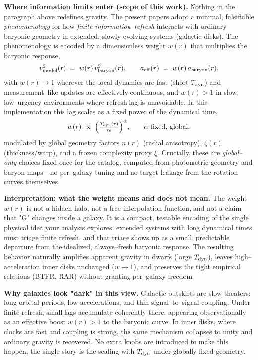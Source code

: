\documentclass[usenatbib]{mnras}
\begin{document}
\vspace{0.5em}
\noindent\textbf{Where information limits enter (scope of this work).}
Nothing in the paragraph above redefines gravity. The present papers adopt a minimal, falsifiable \emph{phenomenology} for how \emph{finite information–refresh} interacts with ordinary baryonic geometry in extended, slowly evolving systems (galactic disks). The phenomenology is encoded by a dimensionless weight \(w(r)\) that multiplies the baryonic response,
\[
v_{\rm model}^2(r) \;=\; w(r)\,v_{\rm baryon}^2(r),
\qquad
a_{\rm eff}(r) \;=\; w(r)\,a_{\rm baryon}(r),
\]
with \(w(r)\to 1\) wherever the local dynamics are fast (short \(T_{\rm dyn}\)) and measurement–like updates are effectively continuous, and \(w(r)>1\) in slow, low–urgency environments where refresh lag is unavoidable. In this implementation this lag scales as a fixed power of the dynamical time,
\[
w(r)\;\propto\;\Big(\tfrac{T_{\rm dyn}(r)}{\tau_0}\Big)^{\alpha},
\qquad \alpha \text{ fixed, global},
\]
modulated by global geometry factors \(n(r)\) (radial anisotropy), \(\zeta(r)\) (thickness/warp), and a frozen complexity proxy \(\xi\).
Crucially, these are \emph{global–only} choices fixed once for the catalog, computed from photometric geometry and baryon maps—no per–galaxy tuning and no target leakage from the rotation curves themselves.

\vspace{0.5em}
\noindent\textbf{Interpretation: what the weight means and does not mean.}
The weight \(w(r)\) is not a hidden halo, not a free interpolation function, and not a claim that "G" changes inside a galaxy. It is a compact, testable encoding of the single physical idea your analysis explores:
extended systems with long dynamical times must triage finite refresh, and that triage shows up as a small, predictable departure from the idealized, always–fresh baryonic response.
The resulting behavior naturally amplifies apparent gravity in dwarfs (large \(T_{\rm dyn}\)), leaves high–acceleration inner disks unchanged (\(w\to 1\)), and preserves the tight empirical relations (BTFR, RAR) without granting per–galaxy freedom.

\vspace{0.5em}
\noindent\textbf{Why galaxies look "dark" in this view.}
Galactic outskirts are slow theaters: long orbital periods, low accelerations, and thin signal–to–signal coupling. Under finite refresh, small lags accumulate coherently there, appearing observationally as an effective boost \(w(r)>1\) to the baryonic curve. In inner disks, where clocks are fast and coupling is strong, the same mechanism collapses to unity and ordinary gravity is recovered. No extra knobs are introduced to make this happen; the single story is the scaling with \(T_{\rm dyn}\) under globally fixed geometry.
\end{document}
